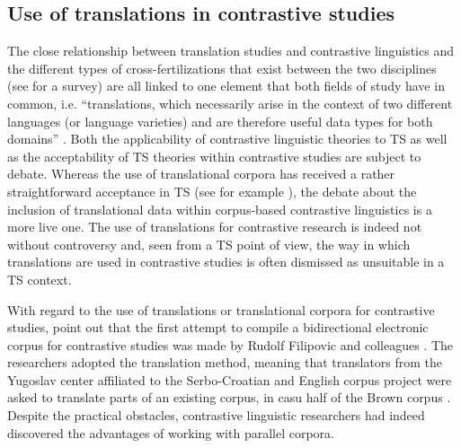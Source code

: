 \subsection{Use of translations in contrastive studies}
\label{sec:2.3.1}  
The close relationship between translation studies and contrastive linguistics and the different types of cross-fertilizations that exist between the two disciplines  (see \citealt{gambier_contrastive_2013} for a survey) are all linked to one element that both fields of study have in common, i.e. “translations, which necessarily arise in the context of two different languages (or language varieties) and are therefore useful data types for both domains” \citep[36]{gambier_contrastive_2013}. Both the applicability of contrastive linguistic theories to TS as well as the acceptability of TS theories within contrastive studies are subject to debate. Whereas the use of translational corpora has received a rather straightforward acceptance in TS (see for example \citealt{wollin_translationese_1986, aijmer_translations_1996,laviosa_corpus-based_2002}), the debate about the inclusion of translational data within corpus-based contrastive linguistics is a more live one. The use of translations for contrastive research is indeed not without controversy and, seen from a TS point of view, the way in which translations are used in contrastive studies is often dismissed as unsuitable in a TS context.

With regard to the use of translations or translational corpora for contrastive studies, \citet[40]{altenberg_recent_2002} point out that the first attempt to compile a bidirectional electronic corpus for contrastive studies was made by Rudolf Filipovic and colleagues \citep{filipovic_choice_1969}. The researchers adopted the translation method, meaning that translators from the Yugoslav center affiliated to the Serbo-Croatian and English corpus project were asked to translate parts of an existing corpus, in casu half of the Brown corpus \citep[38--43]{filipovic_choice_1969}. Despite the practical obstacles, contrastive linguistic researchers had indeed discovered the advantages of working with parallel corpora.

